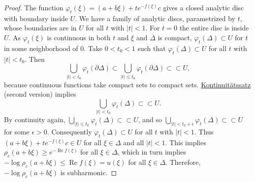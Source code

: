 \documentclass[12pt,openany]{book}
\renewcommand{\Re}{\operatorname{Re}}
\newcommand{\sabs}[1]{\lvert {#1} \rvert}
\theoremstyle{plain}
\theoremstyle{remark}
\theoremstyle{definition}
\theoremstyle{exercise}
\theoremstyle{example}
\begin{document}
\begin{proof}
The function $\varphi_t(\xi) =
(a+b\xi)+te^{-f(\xi)}c$ gives a closed analytic disc with boundary inside
$U$.  We have a family of analytic discs, parametrized by $t$, whose boundaries are in
$U$ for all $t$ with $\sabs{t} < 1$.  For $t=0$ the entire disc is
inside $U$.  As $\varphi_t(\xi)$ is continuous in both $t$ and $\xi$ and
$\overline{\Delta}$ is compact,
$\varphi_t(\Delta) \subset U$ for $t$ in some neighborhood of $0$.
Take $0 < t_0 < 1$ such that
$\varphi_t(\Delta) \subset U$ for all $t$ with $\sabs{t} < t_0$.
Then
\begin{equation*}
\bigcup_{\sabs{t} < t_0} \varphi_t(\partial \Delta)
\subset
\bigcup_{\sabs{t} \leq t_0} \varphi_t(\partial \Delta)
\subset \subset U ,
\end{equation*}
because continuous functions take compact sets to compact sets.
\hyperref[thm:contprinciple2]{Kontinuit\"atssatz} (second version)
implies
\begin{equation*}
\bigcup_{\sabs{t} < t_0} \varphi_t(\Delta)
\subset \subset U  .
\end{equation*}
By continuity again,
$\bigcup_{\sabs{t} \leq t_0} \varphi_t(\Delta)
\subset \subset U$, and so
$\bigcup_{\sabs{t} < t_0+\epsilon} \varphi_t(\Delta)
\subset \subset U$
for some $\epsilon > 0$.
Consequently $\varphi_t(\Delta) \subset U$
for all $t$ with $\sabs{t} < 1$.  Thus
$(a+b\xi)+te^{-f(\xi)}c \in U$ for all $\xi \in \Delta$ and all $\sabs{t} <
1$.  This implies $\rho_c(a+b\xi) \geq e^{-\Re f(\xi)}$ for all $\xi \in
\Delta$, which in
turn implies $-\log \rho_c(a+b\xi) \leq \Re f(\xi) = u(\xi)$ for all $\xi
\in \Delta$.
Therefore, $-\log \rho_c(a+b\xi)$ is subharmonic.
\end{proof}
\end{document}
